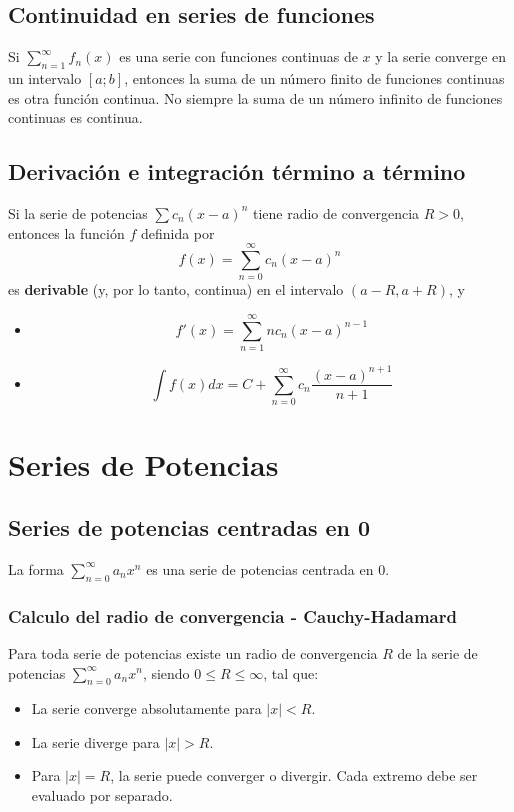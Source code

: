 \documentclass[a4paper,12pt]{article}
\begin{document}
\subsection{Continuidad en series de funciones}
Si $\sum_{n=1}^{\infty} f_n(x)$ es una serie con funciones continuas de $x$ y la serie converge en un intervalo $[a; b]$, entonces la suma de un número finito de funciones continuas es otra función continua. \newline
No siempre la suma de un número infinito de funciones continuas es continua.

\subsection{Derivación e integración término a término}
Si la serie de potencias $\sum c_n (x - a)^n$ tiene radio de convergencia $R > 0$, entonces la función $f$ definida por
$$ f(x) = \sum_{n=0}^{\infty} c_n (x - a)^n $$
es \textbf{derivable} (y, por lo tanto, continua) en el intervalo $(a-R, a+R)$, y
\begin{itemize}
    \item $$f'(x) = \sum_{n=1}^{\infty} n c_n (x - a)^{n-1} $$
    \item $$\int f(x) dx = C + \sum_{n=0}^{\infty} c_n \frac{(x - a)^{n+1}}{n+1} $$
\end{itemize}


\section{Series de Potencias}

\subsection{Series de potencias centradas en 0}
La forma $\sum_{n=0}^{\infty} a_nx^n$ es una serie de potencias centrada en 0. 

\subsubsection{Calculo del radio de convergencia - Cauchy-Hadamard}
Para toda serie de potencias existe un radio de convergencia $R$ de la serie de potencias $\sum_{n=0}^{\infty} a_nx^n$, siendo $0 \leqslant R \leqslant \infty$, tal que:
\begin{itemize}
    \item La serie converge absolutamente para $|x| < R$.
    \item La serie diverge para $|x| > R$.
    \item Para $|x| = R$, la serie puede converger o divergir. Cada extremo debe ser evaluado por separado.
\end{itemize}
\end{document}
